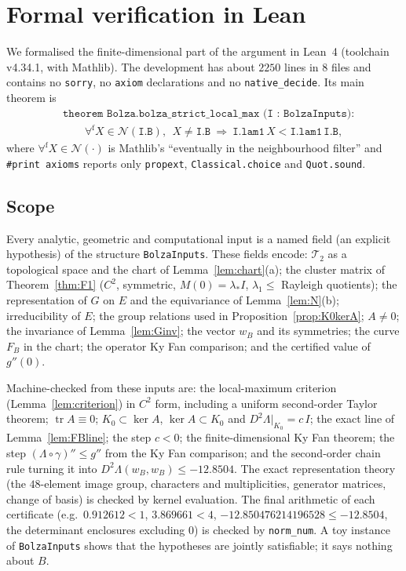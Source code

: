 \documentclass[11pt]{amsart}
\theoremstyle{definition}
\theoremstyle{remark}
\newcommand{\Teich}{\mathcal{T}_2}
\newcommand{\tr}{\operatorname{tr}}
\newcommand{\ls}{\lambda_*}
\newcommand{\wB}{w_B}
\newcommand{\FB}{F_B}
\begin{document}
\section{Formal verification in Lean}\label{sec:lean}

We formalised the finite-dimensional part of the argument in Lean~4 (toolchain v4.34.1, with
Mathlib). The development has about $2250$ lines in $8$ files and contains no \texttt{sorry}, no
\texttt{axiom} declarations and no \texttt{native\_decide}. Its main theorem is
\begin{align*}
&\texttt{theorem Bolza.bolza\_strict\_local\_max (I : BolzaInputs)}:\\
&\qquad\forall^{\mathrm{f}}X\in\mathcal N(\texttt{I.B}),\ \ X\ne\texttt{I.B}\ \Rightarrow\ \texttt{I.lam1}\,X<\texttt{I.lam1}\,\texttt{I.B},
\end{align*}
where $\forall^{\mathrm f}X\in\mathcal N(\cdot)$ is Mathlib's ``eventually in the neighbourhood filter''
and \texttt{\#print axioms} reports only \texttt{propext}, \texttt{Classical.choice} and
\texttt{Quot.sound}.

\subsection{Scope}
Every analytic, geometric and computational input is a named field (an explicit hypothesis) of the
structure \texttt{BolzaInputs}. These fields encode: $\Teich$ as a topological space and the chart
of Lemma~\ref{lem:chart}(a); the cluster matrix of Theorem~\ref{thm:F1} ($C^2$, symmetric, $M(0)=\ls I$,
$\lambda_1\le$ Rayleigh quotients); the representation of $G$ on $E$ and the equivariance of
Lemma~\ref{lem:N}(b); irreducibility of $E$; the group relations used in
Proposition~\ref{prop:K0kerA}; $A\ne0$; the invariance of Lemma~\ref{lem:Ginv}; the vector $\wB$ and
its symmetries; the curve $\FB$ in the chart; the operator Ky Fan comparison; and the certified
value of $g''(0)$.

Machine-checked from these inputs are: the local-maximum criterion (Lemma~\ref{lem:criterion}) in
$C^2$ form, including a uniform second-order Taylor theorem; $\tr A\equiv0$; $K_0\subset\ker A$,
$\ker A\subset K_0$ and $D^2\Lambda|_{K_0}=c\,I$; the exact line of Lemma~\ref{lem:FBline}; the step
$c<0$; the finite-dimensional Ky Fan theorem; the step $(\Lambda\circ\gamma)''\le g''$ from the Ky Fan
comparison; and the second-order chain rule turning it into $D^2\Lambda(\wB,\wB)\le-12.8504$. The exact
representation theory (the $48$-element image group, characters and multiplicities, generator
matrices, change of basis) is checked by kernel evaluation. The final arithmetic of each certificate
(e.g.\ $0.912612<1$, $3.869661<4$, $-12.850476214196528\le-12.8504$, the determinant enclosures
excluding $0$) is checked by \texttt{norm\_num}. A toy instance of \texttt{BolzaInputs} shows that
the hypotheses are jointly satisfiable; it says nothing about $B$.
\end{document}
